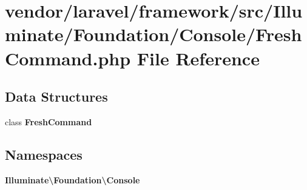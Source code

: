 \section{vendor/laravel/framework/src/\+Illuminate/\+Foundation/\+Console/\+Fresh\+Command.php File Reference}
\label{_fresh_command_8php}
\subsection*{Data Structures}
\begin{DoxyCompactItemize}
\item 
class {\bf Fresh\+Command}
\end{DoxyCompactItemize}
\subsection*{Namespaces}
\begin{DoxyCompactItemize}
\item 
 {\bf Illuminate\textbackslash{}\+Foundation\textbackslash{}\+Console}
\end{DoxyCompactItemize}
